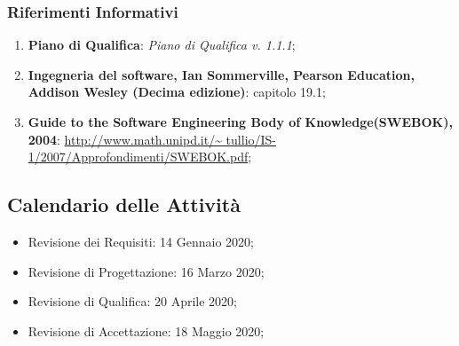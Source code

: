 		\subsubsection{Riferimenti Informativi}
			\begin{enumerate}
				\item \textbf{Piano di Qualifica}: \textit{Piano di Qualifica v. 1.1.1};
				\item \textbf{Ingegneria del software, Ian Sommerville, Pearson Education, Addison Wesley (Decima edizione)}: capitolo 19.1;
				\item \textbf{Guide to the Software Engineering Body of Knowledge(SWEBOK), 2004}: \url{http://www.math.unipd.it/~	tullio/IS-1/2007/Approfondimenti/SWEBOK.pdf};
			\end{enumerate}
		\subsection{Calendario delle Attività}
		\begin{itemize}
			\item Revisione dei Requisiti: 14 Gennaio 2020;
			\item Revisione di Progettazione: 16 Marzo 2020;
			\item Revisione di Qualifica: 20 Aprile 2020;
			\item Revisione di Accettazione: 18 Maggio 2020;			
		\end{itemize}
